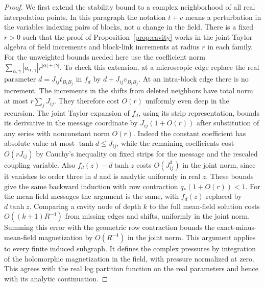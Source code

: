 \documentclass[11pt]{article}
\begin{document}
\begin{proof}
We first extend the stability bound to a complex neighborhood of
all real interpolation points. In this paragraph the notation
\(t+v\) means a perturbation in the variables indexing pairs of
blocks, not a change in the field. There is a fixed \(r>0\) such
that the proof of Proposition~\ref{prop:cavity} works in the joint
Taylor algebra of field increments and block-link increments at
radius \(r\) in each family. For the unweighted bounds needed here
use the coefficient norm \(\sum_{\alpha,\gamma}|a_{\alpha,\gamma}|
 r^{|\alpha|+|\gamma|}\). To check this extension, at a microscopic
edge replace the real parameter \(d=J_{ij}t_{B_iB_j}\) in
\(f_d\) by \(d+J_{ij}v_{B_iB_j}\). At an intra-block edge there is
no increment. The increments in the shifts from deleted neighbors
have total norm at most \(r\sum_j J_{ij}\). They therefore cost
\(O(r)\) uniformly even deep in the recursion. The joint Taylor
expansion of \(f_d\), using its strip representation, bounds
its derivative in the message coordinate by
\(J_{ij}(1+O(r))\) after substitution of any series with
nonconstant norm \(O(r)\). Indeed the constant coefficient has
absolute value at most \(\tanh d\le J_{ij}\), while the remaining
coefficients cost \(O(rJ_{ij})\) by Cauchy's inequality on fixed
strips for the message and the rescaled coupling variable. Also
\(f_d(z)-d\tanh z\) costs \(O(J_{ij}^3)\) in the joint norm, since
it vanishes to order three in \(d\) and is analytic uniformly in
real \(z\). These bounds give the same backward induction with
row contraction \(q_*(1+O(r))<1\). For the mean-field messages the
argument is the same, with \(f_d(z)\) replaced by \(d\tanh z\).
Comparing a cavity node of depth \(k\) to the full mean-field
solution costs \(O((k+1)R^{-4})\) from missing edges and shifts,
uniformly in the joint norm. Summing this error with the
geometric row contraction bounds the exact-minus-mean-field
magnetization by \(O(R^{-4})\) in the joint norm. This argument
applies to every finite induced subgraph. It defines the
complex pressures by integration of the holomorphic
magnetization in the field, with pressure normalized at zero.
This agrees with the real log partition function on the real
parameters and hence with its analytic continuation.


\end{proof}
\end{document}
